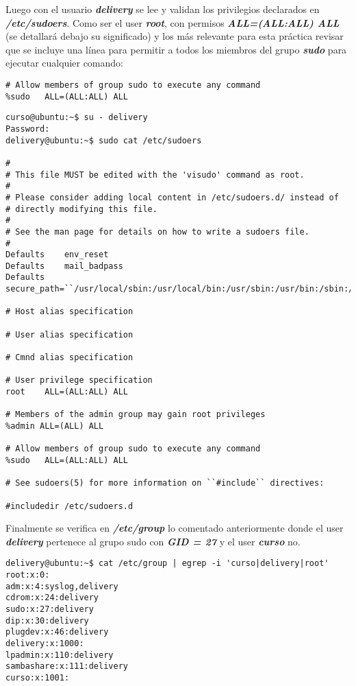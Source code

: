 \documentclass[a4paper,11pt,spanish]{article} %
\newenvironment{myscriptlisting}
{\begin{list}{}{\setlength{\leftmargin}{1em}}\item\scriptsize\bfseries}
{\end{list}}
\begin{document}
Luego con el usuario \textbf{\emph{delivery}} se lee y validan los privilegios
declarados en \textbf{\emph{/etc/sudoers}}. Como ser el user \textbf{\emph{root}}, con permisos 
\textbf{\emph{ALL=(ALL:ALL) ALL}} (se detallará debajo su significado) y los más relevante
para esta práctica revisar que se incluye una línea para permitir a todos los miembros
del grupo \textbf{\emph{\ac{sudo}}} para ejecutar cualquier comando:

\begin{verbatim}
# Allow members of group sudo to execute any command
%sudo	ALL=(ALL:ALL) ALL
\end{verbatim}

\begin{myscriptlisting}
  \begin{verbatim}
curso@ubuntu:~$ su - delivery 
Password: 
delivery@ubuntu:~$ sudo cat /etc/sudoers

#
# This file MUST be edited with the 'visudo' command as root.
#
# Please consider adding local content in /etc/sudoers.d/ instead of
# directly modifying this file.
#
# See the man page for details on how to write a sudoers file.
#
Defaults	env_reset
Defaults	mail_badpass
Defaults	secure_path=``/usr/local/sbin:/usr/local/bin:/usr/sbin:/usr/bin:/sbin:/bin``

# Host alias specification

# User alias specification

# Cmnd alias specification

# User privilege specification
root	ALL=(ALL:ALL) ALL

# Members of the admin group may gain root privileges
%admin ALL=(ALL) ALL

# Allow members of group sudo to execute any command
%sudo	ALL=(ALL:ALL) ALL

# See sudoers(5) for more information on ``#include`` directives:

#includedir /etc/sudoers.d
  \end{verbatim}
\end{myscriptlisting}

Finalmente se verifica en \textbf{\emph{/etc/group}} lo comentado anteriormente
donde el user \textbf{\emph{delivery}} pertenece al grupo \ac{sudo} con \textbf{\emph{GID = 27}}
y el user \textbf{\emph{curso}} no.

\begin{myscriptlisting}
  \begin{verbatim}
delivery@ubuntu:~$ cat /etc/group | egrep -i 'curso|delivery|root'
root:x:0:
adm:x:4:syslog,delivery
cdrom:x:24:delivery
sudo:x:27:delivery
dip:x:30:delivery
plugdev:x:46:delivery
delivery:x:1000:
lpadmin:x:110:delivery
sambashare:x:111:delivery
curso:x:1001:
  \end{verbatim}
\end{myscriptlisting}
\end{document}
